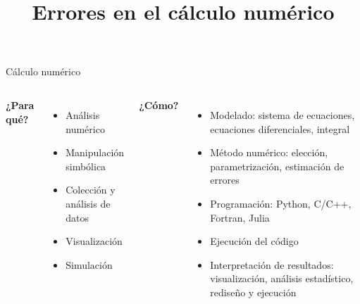 \documentclass[9pt, aspectratio=169]{beamer}
\title{Errores en el cálculo numérico}
\subtitle{}
\begin{document}
\maketitle

\begin{frame}{Cálculo numérico}
\begin{columns}[t]
\cx
\textbf{¿Para qué?}

\begin{itemize}
    \item Análisis numérico
    \item Manipulación simbólica
    \item Colección y análisis de datos
    \item Visualización 
    \item Simulación
\end{itemize}
\pause

\cx
\textbf{¿Cómo?}

\begin{itemize}
    \item Modelado: sistema de ecuaciones, ecuaciones diferenciales, integral
    \item Método numérico: elección, parametrización, \alert{estimación de errores}
    \item Programación: \alert{Python}, C/C++, Fortran, Julia
    \item Ejecución del código
    \item Interpretación de resultados: visualización, análisis estadístico, rediseño y ejecución
\end{itemize}
\end{columns}
\end{frame}
\end{document}

